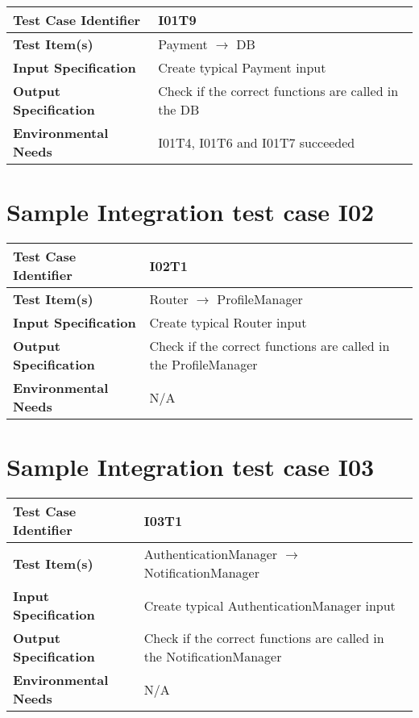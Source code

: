 \begin{center}
	\vspace{0.6cm}
	\begin{tabular}{|l|l|}
		\hline
		\textbf{Test Case Identifier} & I01T9 \bigstrut \\\hline
		\textbf{Test Item(s)} & Payment \ensuremath{\rightarrow} DB \bigstrut \\\hline
		\textbf{Input Specification} & Create typical Payment input \bigstrut \\\hline
		\textbf{Output Specification} & Check if the correct functions are called in the DB \bigstrut \\\hline
		\textbf{Environmental Needs} & I01T4, I01T6 and I01T7 succeeded \bigstrut \\\hline
	\end{tabular}
\end{center}


\section{Sample Integration test case I02}\label{I02}
\begin{center}
	\vspace{0.6cm}
	\begin{tabular}{|l|l|}
		\hline
		\textbf{Test Case Identifier} & I02T1 \bigstrut \\\hline
		\textbf{Test Item(s)} & Router \ensuremath{\rightarrow} ProfileManager \bigstrut \\\hline
		\textbf{Input Specification} & Create typical Router input \bigstrut \\\hline
		\textbf{Output Specification} & Check if the correct functions are called in the ProfileManager \bigstrut \\\hline
		\textbf{Environmental Needs} & N/A \bigstrut \\\hline
	\end{tabular}
\end{center}

\section{Sample Integration test case I03}\label{I03}
\begin{center}
	\vspace{0.6cm}
	\begin{tabular}{|l|l|}
		\hline
		\textbf{Test Case Identifier} & I03T1 \bigstrut \\\hline
		\textbf{Test Item(s)} & AuthenticationManager \ensuremath{\rightarrow} NotificationManager \bigstrut \\\hline
		\textbf{Input Specification} & Create typical AuthenticationManager input \bigstrut \\\hline
		\textbf{Output Specification} & Check if the correct functions are called in the NotificationManager \bigstrut \\\hline
		\textbf{Environmental Needs} & N/A \bigstrut \\\hline
	\end{tabular}
\end{center}

